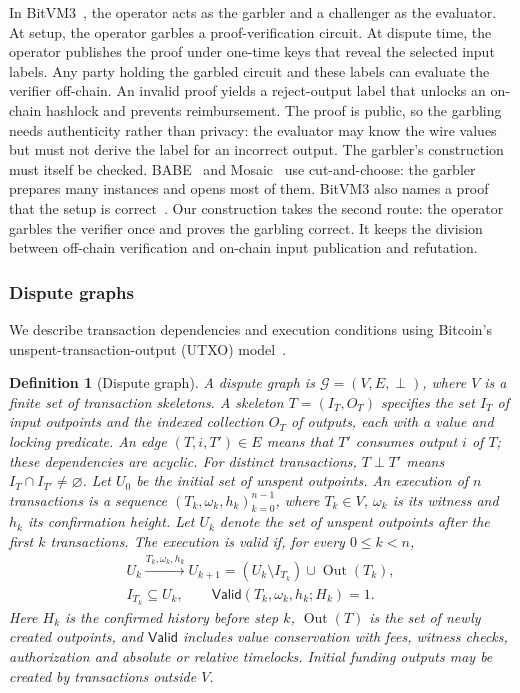 \documentclass[11pt]{article}
\newtheorem{definition}{Definition}
\begin{document}
In BitVM3~\cite{bitvm3paper}, the
operator acts as the garbler and a challenger as the evaluator. At setup,
the operator garbles a proof-verification circuit. At dispute time, the
operator publishes the proof under one-time keys that reveal the selected
input labels. Any party holding the garbled circuit and these labels can
evaluate the verifier off-chain. An invalid proof yields a reject-output
label that unlocks an on-chain hashlock and prevents reimbursement. The
proof is public, so the garbling needs authenticity rather than privacy:
the evaluator may know the wire values but must not derive the label for
an incorrect output. The garbler's construction must itself be checked.
BABE~\cite{babe2026} and Mosaic~\cite{mosaic26} use cut-and-choose: the
garbler prepares many instances and opens most of them. BitVM3 also names a
proof that the setup is correct~\cite{bitvm3paper}. Our construction takes
the second route: the operator garbles the verifier once and proves the
garbling correct. It keeps the division between off-chain verification and
on-chain input publication and refutation.

\subsubsection{Dispute graphs}\label{sec:disputegraph}

We describe transaction dependencies and execution conditions using Bitcoin's
unspent-transaction-output (UTXO) model~\cite[\S2.2 and Appendix~B.2]{laa25bitvm2}.

\begin{definition}[Dispute graph]\label{def:disputegraph}
A dispute graph is $\mathcal G=(V,E,\perp)$, where $V$ is a finite set of
transaction skeletons. A skeleton $T=(I_T,O_T)$ specifies the set $I_T$ of
input outpoints and the indexed collection $O_T$ of outputs, each with a
value and locking predicate. An edge
$(T,i,T')\in E$ means that $T'$ consumes output $i$ of $T$;
these dependencies are acyclic.
For distinct transactions, $T\perp T'$ means $I_T\cap I_{T'}\ne\varnothing$.
Let $U_0$ be the initial set of unspent outpoints. An execution of $n$
transactions is a sequence
$(T_k,\omega_k,h_k)_{k=0}^{n-1}$, where $T_k\in V$, $\omega_k$ is its
witness and $h_k$ its confirmation height. Let $U_k$ denote the set of
unspent outpoints after the first $k$ transactions. The execution is valid
if, for every $0\le k<n$,
\[
  \begin{gathered}
  U_k\xrightarrow{T_k,\omega_k,h_k}U_{k+1}
  =(U_k\setminus I_{T_k})\cup\operatorname{Out}(T_k),\\
  I_{T_k}\subseteq U_k,\qquad
  \mathsf{Valid}(T_k,\omega_k,h_k;H_k)=1.
  \end{gathered}
\]
Here $H_k$ is the confirmed history before step $k$, $\operatorname{Out}(T)$
is the set of newly created outpoints, and
$\mathsf{Valid}$ includes value conservation with fees, witness checks,
authorization and absolute or relative timelocks. Initial funding outputs
may be created by transactions outside $V$.
\end{definition}
\end{document}
